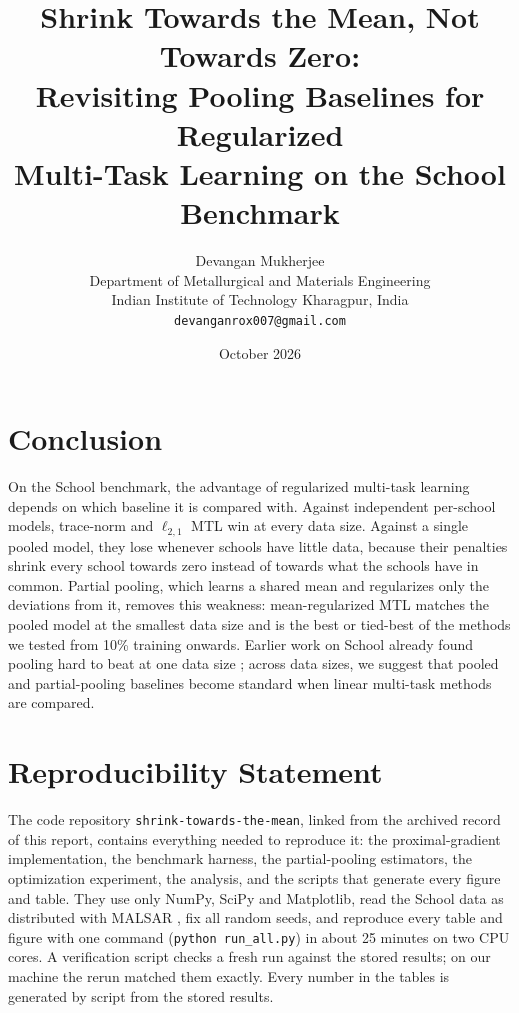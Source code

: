 

\title{\textbf{Shrink Towards the Mean, Not Towards Zero:\\ Revisiting Pooling Baselines for Regularized\\ Multi-Task Learning on the School Benchmark}}
\author{
  Devangan Mukherjee\\[2pt]
  Department of Metallurgical and Materials Engineering\\
  Indian Institute of Technology Kharagpur, India\\
  \texttt{devanganrox007@gmail.com}
}
\date{October 2026}


\maketitle

\begin{abstract}

\end{abstract}







\section{Conclusion}
\label{sec:conclusion}
On the School benchmark, the advantage of regularized multi-task learning depends on which baseline it is compared with. Against independent per-school models, trace-norm and $\ell_{2,1}$ MTL win at every data size. Against a single pooled model, they lose whenever schools have little data, because their penalties shrink every school towards zero instead of towards what the schools have in common. Partial pooling, which learns a shared mean and regularizes only the deviations from it, removes this weakness: mean-regularized MTL matches the pooled model at the smallest data size and is the best or tied-best of the methods we tested from 10\% training onwards. Earlier work on School already found pooling hard to beat at one data size \citep{evgeniou2005kernel}; across data sizes, we suggest that pooled and partial-pooling baselines become standard when linear multi-task methods are compared.

\section*{Reproducibility Statement}
The code repository \texttt{shrink-towards-the-mean}, linked from the archived record of this report, contains everything needed to reproduce it: the proximal-gradient implementation, the benchmark harness, the partial-pooling estimators, the optimization experiment, the analysis, and the scripts that generate every figure and table. They use only NumPy, SciPy and Matplotlib, read the School data as distributed with MALSAR \citep{zhou2011malsar}, fix all random seeds, and reproduce every table and figure with one command (\texttt{python run\_all.py}) in about 25 minutes on two CPU cores. A verification script checks a fresh run against the stored results; on our machine the rerun matched them exactly. Every number in the tables is generated by script from the stored results.

